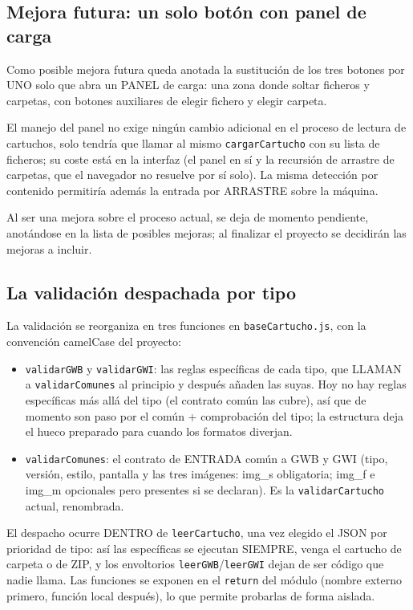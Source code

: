 \subsection{Mejora futura: un solo botón con panel de carga}
\label{sec:F5I9Unificacion}

Como posible mejora futura queda anotada la sustitución de los tres
botones por UNO solo que abra un PANEL de carga: una zona donde
soltar ficheros y carpetas, con botones auxiliares de elegir fichero
y elegir carpeta.

El manejo del panel no exige ningún cambio adicional en el proceso
de lectura de cartuchos, solo tendría que llamar al mismo
\texttt{cargarCartucho} con su lista de ficheros; su coste está en
la interfaz (el panel en sí y la recursión de arrastre de carpetas,
que el navegador no resuelve por sí solo). La misma detección por
contenido permitiría además la entrada por ARRASTRE sobre la
máquina.

Al ser una mejora sobre el proceso actual, se deja de momento
pendiente, anotándose en la lista de posibles mejoras; al finalizar
el proyecto se decidirán las mejoras a incluir.

\subsection{La validación despachada por tipo}
\label{sec:F5I9Validacion}

La validación se reorganiza en tres funciones en
\texttt{baseCartucho.js}, con la convención camelCase del proyecto:

\begin{itemize}
	\item \texttt{validarGWB} y \texttt{validarGWI}: las reglas
	específicas de cada tipo, que LLAMAN a \texttt{validarComunes} al
	principio y después añaden las suyas. Hoy no hay reglas
	específicas más allá del tipo (el contrato común las cubre), así que
	de momento son paso por el común + comprobación del tipo; la
	estructura deja el hueco preparado para cuando los formatos
	diverjan.
	
	\item \texttt{validarComunes}: el contrato de ENTRADA común a
	GWB y GWI (tipo, versión, estilo, pantalla y las tres imágenes:
	img\_s obligatoria; img\_f e img\_m opcionales pero presentes si
	se declaran). Es la \texttt{validarCartucho} actual, renombrada.
\end{itemize}

El despacho ocurre DENTRO de \texttt{leerCartucho}, una vez elegido
el JSON por prioridad de tipo: así las específicas se ejecutan
SIEMPRE, venga el cartucho de carpeta o de ZIP, y los envoltorios
\texttt{leerGWB}/\texttt{leerGWI} dejan de ser código que nadie
llama. Las funciones se exponen en el \texttt{return} del módulo
(nombre externo primero, función local después), lo que permite
probarlas de forma aislada.

